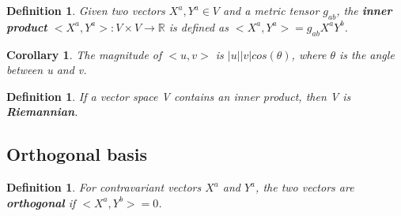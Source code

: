 \documentclass{book}
\newtheorem{defn}[equation]{Definition}
\newtheorem{coro}[equation]{Corollary}
\begin{document}
\begin{defn}
	Given two vectors $X^a,Y^a \in V$ and a metric tensor $g_{ab}$, the \textbf{inner product} $<X^a,Y^a> : V \times V \to \mathbb{R}$ is defined as $<X^a,Y^a> = g_{ab}X^aY^b$. 
\end{defn}

\begin{coro}
	The magnitude of $<u,v>$ is $|u||v|cos(\theta)$, where $\theta$ is the angle between u and v. 
\end{coro}

\begin{defn}
	If a vector space V contains an inner product, then V is \textbf{Riemannian}.
	\end{defn}



\subsection{Orthogonal basis}

\begin{defn}
	For contravariant vectors $X^a$ and $Y^a$, the two vectors are \textbf{orthogonal} if $<X^a,Y^b> = 0$. 
\end{defn}
\end{document}
